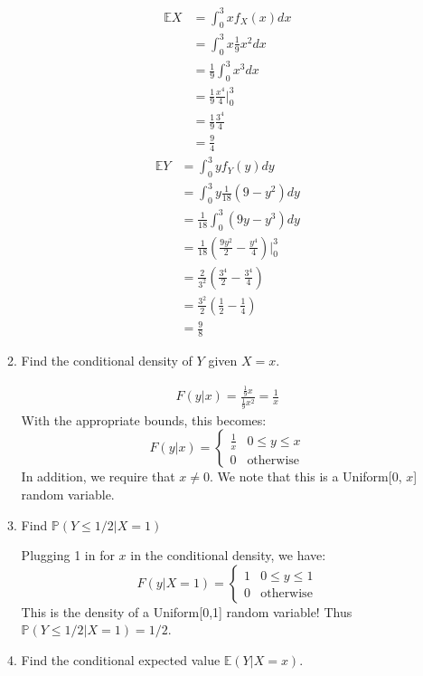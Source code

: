 \documentclass[12pt]{article}
\def\P{{\mathbb P}}
\def\E{{\mathbb E}}
\begin{document}
\begin{enumerate}
\begin{enumerate}
\begin{align*}
\E{X} &= \int_0^3 x f_X(x) dx \\
&= \int_0^3 x \frac{1}{9}x^2 dx \\
&= \frac{1}{9} \int_0^3 x^3 dx \\
&= \frac{1}{9} \frac{x^4}{4}\Bigr|_0^3 \\
&= \frac{1}{9}\frac{3^4}{4} \\
&= \frac{9}{4}
\end{align*}
\begin{align*}
\E{Y} &= \int_0^3 y f_Y(y) dy \\
&= \int_0^3 y \frac{1}{18}(9 - y^2) dy \\
&= \frac{1}{18} \int_0^3 (9y - y^3) dy \\
&= \frac{1}{18} \left( \frac{9y^2}{2} - \frac{y^4}{4} \right)|_0^3 \\
&= \frac{2}{3^2} \left( \frac{3^4}{2} - \frac{3^4}{4} \right) \\
&= \frac{3^2}{2} \left( \frac{1}{2} - \frac{1}{4} \right) \\
&= \frac{9}{8}
\end{align*}

\item Find the conditional density of $Y$ given $X = x$.

\begin{align*}
F(y|x) = \frac{\frac{1}{9} x}{\frac{1}{9} x^2} = \frac{1}{x}
\end{align*}
With the appropriate bounds, this becomes:
\[
F(y|x) = \begin{cases}
\frac{1}{x} & 0 \leq y \leq x \\
0 & \text{otherwise}
\end{cases}
\]
In addition, we require that $x \neq 0$. We note that this is a Uniform[0, $x$] random variable.

\item Find $\P(Y \leq  1/2 | X = 1)$

Plugging 1 in for $x$ in the conditional density, we have:
\[
F(y|X = 1) = \begin{cases}
1 & 0 \leq y \leq 1 \\
0 & \text{otherwise}
\end{cases}
\]
This is the density of a Uniform[0,1] random variable! Thus $\P(Y \leq  1/2 | X = 1) = 1/2$.

\item Find the conditional expected value $\E(Y|X = x)$.\\


\end{enumerate}
\end{enumerate}
\end{document}
